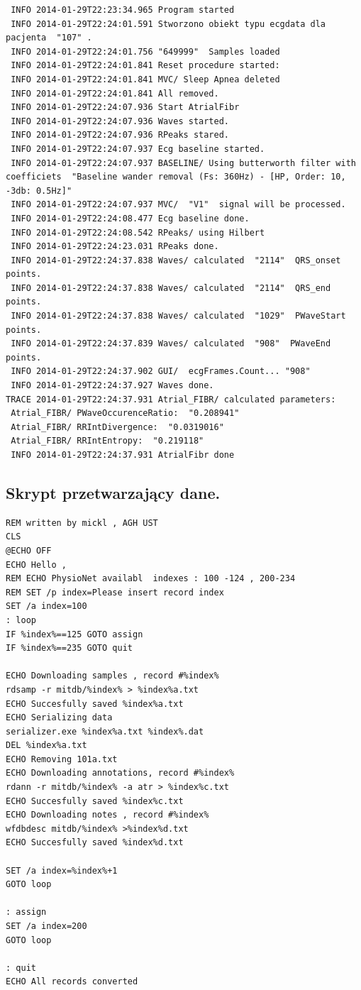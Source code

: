 \begin{minipage}{\textwidth}
\begin{verbatim}
 INFO 2014-01-29T22:23:34.965 Program started 
 INFO 2014-01-29T22:24:01.591 Stworzono obiekt typu ecgdata dla pacjenta  "107" . 
 INFO 2014-01-29T22:24:01.756 "649999"  Samples loaded 
 INFO 2014-01-29T22:24:01.841 Reset procedure started: 
 INFO 2014-01-29T22:24:01.841 MVC/ Sleep Apnea deleted 
 INFO 2014-01-29T22:24:01.841 All removed. 
 INFO 2014-01-29T22:24:07.936 Start AtrialFibr 
 INFO 2014-01-29T22:24:07.936 Waves started. 
 INFO 2014-01-29T22:24:07.936 RPeaks stared. 
 INFO 2014-01-29T22:24:07.937 Ecg baseline started. 
 INFO 2014-01-29T22:24:07.937 BASELINE/ Using butterworth filter with coefficiets  "Baseline wander removal (Fs: 360Hz) - [HP, Order: 10, -3db: 0.5Hz]" 
 INFO 2014-01-29T22:24:07.937 MVC/  "V1"  signal will be processed. 
 INFO 2014-01-29T22:24:08.477 Ecg baseline done. 
 INFO 2014-01-29T22:24:08.542 RPeaks/ using Hilbert 
 INFO 2014-01-29T22:24:23.031 RPeaks done. 
 INFO 2014-01-29T22:24:37.838 Waves/ calculated  "2114"  QRS_onset points. 
 INFO 2014-01-29T22:24:37.838 Waves/ calculated  "2114"  QRS_end points. 
 INFO 2014-01-29T22:24:37.838 Waves/ calculated  "1029"  PWaveStart points. 
 INFO 2014-01-29T22:24:37.839 Waves/ calculated  "908"  PWaveEnd points. 
 INFO 2014-01-29T22:24:37.902 GUI/  ecgFrames.Count... "908" 
 INFO 2014-01-29T22:24:37.927 Waves done. 
TRACE 2014-01-29T22:24:37.931 Atrial_FIBR/ calculated parameters: 
 Atrial_FIBR/ PWaveOccurenceRatio:  "0.208941" 
 Atrial_FIBR/ RRIntDivergence:  "0.0319016" 
 Atrial_FIBR/ RRIntEntropy:  "0.219118" 
 INFO 2014-01-29T22:24:37.931 AtrialFibr done 
\end{verbatim}
\end{minipage}

\subsection{Skrypt przetwarzający dane.}
\label{sec:skrypt}

\begin{minipage}{\textwidth}
\begin{verbatim}
REM written by mickl , AGH UST
CLS
@ECHO OFF
ECHO Hello ,
REM ECHO PhysioNet availabl  indexes : 100 -124 , 200-234
REM SET /p index=Please insert record index
SET /a index=100
: loop
IF %index%==125 GOTO assign
IF %index%==235 GOTO quit

ECHO Downloading samples , record #%index%
rdsamp -r mitdb/%index% > %index%a.txt
ECHO Succesfully saved %index%a.txt
ECHO Serializing data
serializer.exe %index%a.txt %index%.dat
DEL %index%a.txt
ECHO Removing 101a.txt
ECHO Downloading annotations, record #%index%
rdann -r mitdb/%index% -a atr > %index%c.txt
ECHO Succesfully saved %index%c.txt
ECHO Downloading notes , record #%index%
wfdbdesc mitdb/%index% >%index%d.txt
ECHO Succesfully saved %index%d.txt

SET /a index=%index%+1
GOTO loop

: assign
SET /a index=200
GOTO loop

: quit
ECHO All records converted
\end{verbatim}
\end{minipage}
